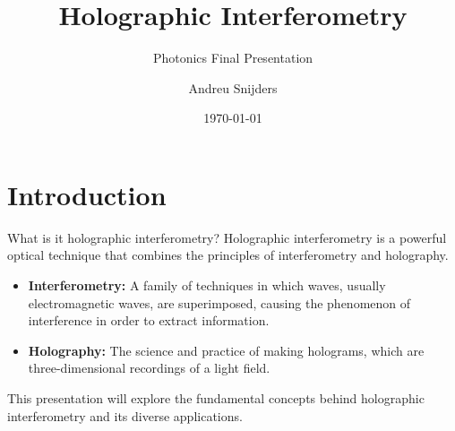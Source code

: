 \documentclass{beamer}
\title{Holographic Interferometry}
\subtitle{Photonics Final Presentation}
\author{Andreu Snijders} %
\date{\today}
\begin{document}
\frame{\titlepage}

\section{Introduction}
\begin{frame}{What is it holographic interferometry?}
    Holographic interferometry is a powerful optical technique that combines the principles of interferometry and holography.
    \begin{itemize}
        \item \textbf{Interferometry:} A family of techniques in which waves, usually electromagnetic waves, are superimposed, causing the phenomenon of interference in order to extract information.
        \item \textbf{Holography:} The science and practice of making holograms, which are three-dimensional recordings of a light field.
    \end{itemize}
    This presentation will explore the fundamental concepts behind holographic interferometry and its diverse applications.
\end{frame}
\end{document}
